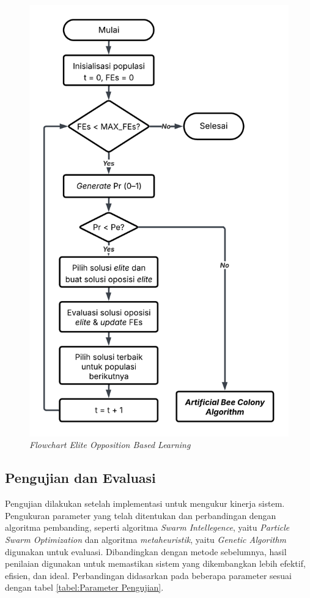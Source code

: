 \begin{figure} [H]
    \centering
    \includegraphics[width=0.85\linewidth]{gambar/Flowchart EOBL.png}
    \caption{\textit{Flowchart Elite Opposition Based Learning}}
    \label{figure:Flowchart EOBL}
\end{figure}

\subsection{Pengujian dan Evaluasi}
Pengujian dilakukan setelah implementasi untuk mengukur kinerja sistem. Pengukuran parameter yang telah ditentukan dan perbandingan dengan algoritma pembanding, seperti algoritma \textit{Swarm Intellegence}, yaitu \textit{Particle Swarm Optimization} dan algoritma \textit{metaheuristik}, yaitu \textit{Genetic Algorithm} digunakan untuk evaluasi. Dibandingkan dengan metode sebelumnya, hasil penilaian digunakan untuk memastikan sistem yang dikembangkan lebih efektif, efisien, dan ideal. Perbandingan didasarkan pada beberapa parameter sesuai dengan tabel \ref{tabel:Parameter Pengujian}.

